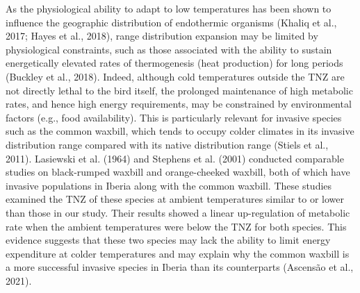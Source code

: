\documentclass[10pt, twoside]{book} %
\begin{document}
As the physiological ability to adapt to low temperatures has been shown to influence the geographic distribution of endothermic organisms (Khaliq et al., 2017; Hayes et al., 2018), range distribution expansion may be limited by physiological constraints, such as those associated with the ability to sustain energetically elevated rates of thermogenesis (heat production) for long periods (Buckley et al., 2018). Indeed, although cold temperatures outside the TNZ are not directly lethal to the bird itself, the prolonged maintenance of high metabolic rates, and hence high energy requirements, may be constrained by environmental factors (e.g., food availability). This is particularly relevant for invasive species such as the common waxbill, which tends to occupy colder climates in its invasive distribution range compared with its native distribution range (Stiels et al., 2011). Lasiewski et al. (1964) and Stephens et al. (2001) conducted comparable studies on black-rumped waxbill and orange-cheeked waxbill, both of which have invasive populations in Iberia along with the common waxbill. These studies examined the TNZ of these species at ambient temperatures similar to or lower than those in our study. Their results showed a linear up-regulation of metabolic rate when the ambient temperatures were below the TNZ for both species. This evidence suggests that these two species may lack the ability to limit energy expenditure at colder temperatures and may explain why the common waxbill is a more successful invasive species in Iberia than its counterparts (Ascensão et al., 2021).\\
\end{document}
